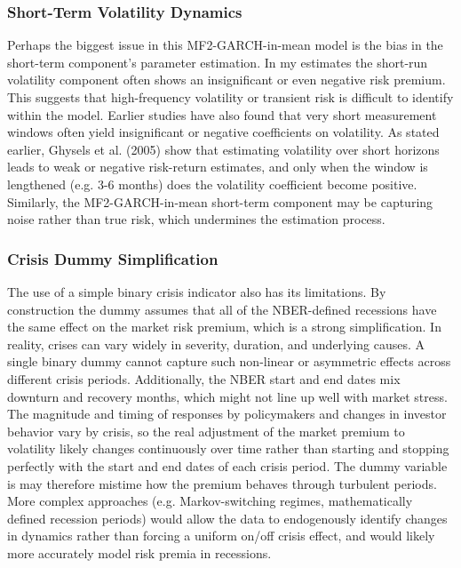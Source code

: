 \documentclass[12pt]{article}
\begin{document}
\subsubsection{Short-Term Volatility Dynamics}
Perhaps the biggest issue in this MF2-GARCH-in-mean model is the bias in the short-term component's parameter estimation. In my estimates the short-run volatility component often shows an insignificant or even negative risk premium. This suggests that high-frequency volatility or transient risk is difficult to identify within the model. Earlier studies have also found that very short measurement windows often yield insignificant or negative coefficients on volatility. As stated earlier, Ghysels et al. (2005) show that estimating volatility over short horizons leads to weak or negative risk-return estimates, and only when the window is lengthened (e.g. 3-6 months) does the volatility coefficient become positive. Similarly, the MF2-GARCH-in-mean short-term component may be capturing noise rather than true risk, which undermines the estimation process. 
\subsubsection{Crisis Dummy Simplification}
The use of a simple binary crisis indicator also has its limitations. By construction the dummy assumes that all of the NBER-defined recessions have the same effect on the market risk premium, which is a strong simplification. In reality, crises can vary widely in severity, duration, and underlying causes. A single binary dummy cannot capture such non-linear or asymmetric effects across different crisis periods. Additionally, the NBER start and end dates mix downturn and recovery months, which might not line up well with market stress. The magnitude and timing of responses by policymakers and changes in investor behavior vary by crisis, so the real adjustment of the market premium to volatility likely changes continuously over time rather than starting and stopping perfectly with the start and end dates of each crisis period. The dummy variable is may therefore mistime how the premium behaves through turbulent periods. More complex approaches (e.g. Markov-switching regimes, mathematically defined recession periods) would allow the data to endogenously identify changes in dynamics rather than forcing a uniform on/off crisis effect, and would likely more accurately model risk premia in recessions.
\end{document}
